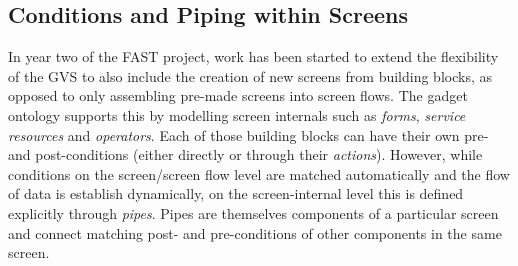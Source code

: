 \documentclass[twoside]{fast_latex}
\begin{document}
% 
% 
% 
% 
% 
% 
% 
% 
% 

\subsection{Conditions and Piping within Screens} %
\label{sub:piping_within_screens}

In year two of the FAST project, work has been started to extend the flexibility of the GVS to also include the creation of new screens from building blocks, as opposed to only assembling pre-made screens into screen flows. The gadget ontology supports this by modelling screen internals such as \emph{forms}, \emph{service resources} and \emph{operators}. Each of those building blocks can have their own pre- and post-conditions (either directly or through their \emph{actions}). However, while conditions on the screen/screen flow level are matched automatically and the flow of data is establish dynamically, on the screen-internal level this is defined explicitly through \emph{pipes}. Pipes are themselves components of a particular screen and connect matching post- and pre-conditions of other components in the same screen. 
\end{document}
